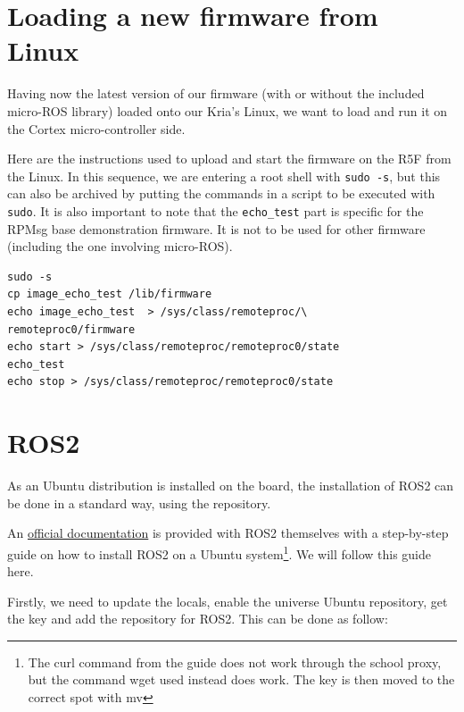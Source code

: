 \documentclass[10pt]{article}
\begin{document}
\section{Loading a new firmware from Linux}
Having now the latest version of our firmware (with or without the included
micro-ROS library) loaded onto our Kria's Linux, we want to load and run it
on the Cortex micro-controller side.

Here are the instructions used to upload and start the firmware
on the R5F from the Linux.
In this sequence, we are entering a root shell with \verb|sudo -s|, but this can
also be archived by putting the commands in a script to be executed with \verb|sudo|.
It is also important to note that the \verb|echo_test| part is specific for the
RPMsg base demonstration firmware. It is not to be used for other firmware
(including the one involving micro-ROS).
\begin{tcolorbox}
\begin{verbatim}
sudo -s
cp image_echo_test /lib/firmware
echo image_echo_test  > /sys/class/remoteproc/\
remoteproc0/firmware
echo start > /sys/class/remoteproc/remoteproc0/state
echo_test
echo stop > /sys/class/remoteproc/remoteproc0/state
\end{verbatim}
\end{tcolorbox}

\pagebreak
\section{ROS2}
\label{sec:ros2}
As an Ubuntu distribution is installed on the board, the installation of ROS2
can be done in a standard way, using the repository.

An \href{https://docs.ros.org/en/humble/Installation/Ubuntu-Install-Debians.html}{official documentation}
is provided with ROS2 themselves with a step-by-step guide on how to install
ROS2 on a Ubuntu system\footnote{The curl command from the guide does not work through the school proxy,
  but the command wget used instead does work. The key is then moved to the correct spot with mv}.
We will follow this guide here.

Firstly, we need to update the locals, enable the universe Ubuntu repository,
get the key and add the repository for ROS2. This can be done as follow:
\end{document}
